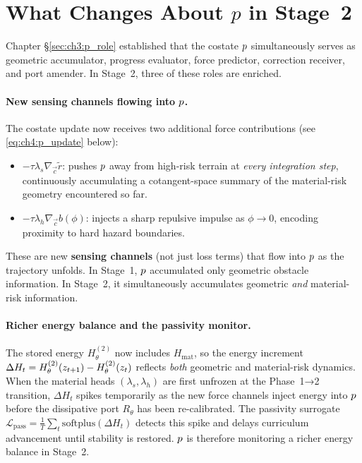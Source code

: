 \section{What Changes About \texorpdfstring{$p$}{p} in Stage~2}
\label{sec:ch4:p_role}

Chapter §\ref{sec:ch3:p_role} established that the
costate $p$ simultaneously serves as geometric accumulator,
progress evaluator, force predictor, correction receiver, and port
amender.
In Stage~2, three of these roles are enriched.

\paragraph{New sensing channels flowing into $p$.}
The costate update now receives two additional force contributions
(see \eqref{eq:ch4:p_update} below):
\begin{itemize}
  \item $-\tau\lambda_s\nabla_{\vec{c}}\tilde{r}$: pushes $p$ away
        from high-risk terrain at \emph{every integration step},
        continuously accumulating a cotangent-space summary of the
        material-risk geometry encountered so far.
  \item $-\tau\lambda_h\nabla_{\vec{c}}b(\phi)$: injects a sharp
        repulsive impulse as $\phi\to 0$, encoding proximity to
        hard hazard boundaries.
\end{itemize}
These are new \textbf{sensing channels} (not just loss terms) that flow
into $p$ as the trajectory unfolds.
In Stage~1, $p$ accumulated only geometric obstacle information.
In Stage~2, it simultaneously accumulates geometric \emph{and}
material-risk information.

\paragraph{Richer energy balance and the passivity monitor.}
The stored energy $H_\theta^{(2)}$ now includes $H_{\mathrm{mat}}$,
so the energy increment $\Delta H_t = H_\theta^{(2)}(z_{t+1})
- H_\theta^{(2)}(z_t)$ reflects \emph{both} geometric and
material-risk dynamics.
When the material heads $(\lambda_s,\lambda_h)$ are first unfrozen
at the Phase~1→2 transition, $\Delta H_t$ spikes temporarily as the new
force channels inject energy into $p$ before the dissipative port
$R_\theta$ has been re-calibrated.
The passivity surrogate $\mathcal{L}_{\mathrm{pass}} = \frac{1}{T}\sum_t
\mathrm{softplus}(\Delta H_t)$ detects this spike and delays curriculum
advancement until stability is restored.
$p$ is therefore monitoring a richer energy balance in Stage~2.


